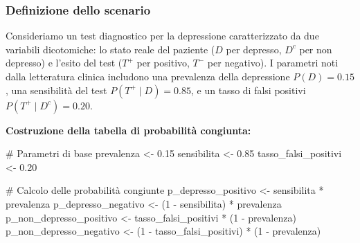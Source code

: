 \documentclass[
  letterpaper,
  DIV=11,
  numbers=noendperiod,
  oneside]{scrreprt}
\newenvironment{Shaded}{\begin{snugshade}}{\end{snugshade}}
\newcommand{\CommentTok}[1]{\textcolor[rgb]{0.37,0.37,0.37}{#1}}
\newcommand{\DecValTok}[1]{\textcolor[rgb]{0.68,0.00,0.00}{#1}}
\newcommand{\FloatTok}[1]{\textcolor[rgb]{0.68,0.00,0.00}{#1}}
\newcommand{\NormalTok}[1]{\textcolor[rgb]{0.00,0.23,0.31}{#1}}
\newcommand{\OtherTok}[1]{\textcolor[rgb]{0.00,0.23,0.31}{#1}}
\newcommand{\SpecialCharTok}[1]{\textcolor[rgb]{0.37,0.37,0.37}{#1}}
\theoremstyle{definition}
\theoremstyle{plain}
\theoremstyle{definition}
\theoremstyle{remark}
\begin{document}
\begin{tcolorbox}[enhanced jigsaw, arc=.35mm, breakable, colbacktitle=quarto-callout-note-color!10!white, opacityback=0, toprule=.15mm, rightrule=.15mm, colback=white, opacitybacktitle=0.6, leftrule=.75mm, coltitle=black, bottomtitle=1mm, left=2mm, toptitle=1mm, title=\textcolor{quarto-callout-note-color}{\faInfo}\hspace{0.5em}{Esempio di costruzione di una tabella di probabilità congiunta 2×2}, titlerule=0mm, bottomrule=.15mm, colframe=quarto-callout-note-color-frame]

\subsubsection*{Definizione dello
scenario}\label{definizione-dello-scenario}

Consideriamo un test diagnostico per la depressione caratterizzato da
due variabili dicotomiche: lo stato reale del paziente (\(D\) per
depresso, \(D^c\) per non depresso) e l'esito del test (\(T^+\) per
positivo, \(T^-\) per negativo). I parametri noti dalla letteratura
clinica includono una prevalenza della depressione \(P(D) = 0.15\), una
sensibilità del test \(P(T^+ \mid D) = 0.85\), e un tasso di falsi
positivi \(P(T^+ \mid D^c) = 0.20\).

\textbf{Costruzione della tabella di probabilità congiunta:}

\begin{Shaded}
\begin{Highlighting}[]
\CommentTok{\# Parametri di base}
\NormalTok{prevalenza }\OtherTok{\textless{}{-}} \FloatTok{0.15}
\NormalTok{sensibilita }\OtherTok{\textless{}{-}} \FloatTok{0.85}
\NormalTok{tasso\_falsi\_positivi }\OtherTok{\textless{}{-}} \FloatTok{0.20}

\CommentTok{\# Calcolo delle probabilità congiunte}
\NormalTok{p\_depresso\_positivo }\OtherTok{\textless{}{-}}\NormalTok{ sensibilita }\SpecialCharTok{*}\NormalTok{ prevalenza}
\NormalTok{p\_depresso\_negativo }\OtherTok{\textless{}{-}}\NormalTok{ (}\DecValTok{1} \SpecialCharTok{{-}}\NormalTok{ sensibilita) }\SpecialCharTok{*}\NormalTok{ prevalenza}
\NormalTok{p\_non\_depresso\_positivo }\OtherTok{\textless{}{-}}\NormalTok{ tasso\_falsi\_positivi }\SpecialCharTok{*}\NormalTok{ (}\DecValTok{1} \SpecialCharTok{{-}}\NormalTok{ prevalenza)}
\NormalTok{p\_non\_depresso\_negativo }\OtherTok{\textless{}{-}}\NormalTok{ (}\DecValTok{1} \SpecialCharTok{{-}}\NormalTok{ tasso\_falsi\_positivi) }\SpecialCharTok{*}\NormalTok{ (}\DecValTok{1} \SpecialCharTok{{-}}\NormalTok{ prevalenza)}


\end{Highlighting}
\end{Shaded}
\end{tcolorbox}
\end{document}
